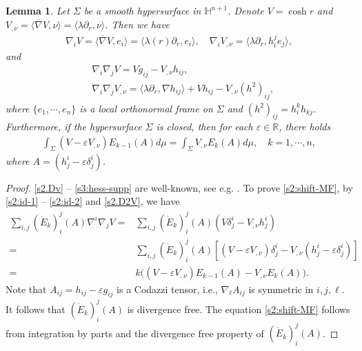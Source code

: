 \documentclass[11pt,reqno]{amsart}
\newtheorem{lem}[thm]{Lemma}
\theoremstyle{definition}
\theoremstyle{remark}
\numberwithin{equation}{section}
\renewcommand{\(}{\left(}
\renewcommand{\)}{\right)}
\renewcommand{\~}{\widetilde}
\renewcommand{\-}{\overline}
\renewcommand{\d}{\delta}
\newcommand{\e}{\varepsilon}
\renewcommand{\l}{\lambda}
\renewcommand{\l}{\lambda}
\begin{document}
\begin{lem}
	Let $\Sigma$ be a smooth hypersurface in $\mathbb H^{n+1}$. Denote $V=\cosh r$ and $V_{,\nu}=\langle \-\nabla V,\nu\rangle=\langle \l\partial_r,\nu\rangle$. Then we have
    \begin{align}\label{s2.Dv}
		\nabla_i V =\langle \-\nabla V,e_i\rangle=\langle \l(r)\partial_r,e_i\rangle, \quad \nabla_i V_{,\nu}=\langle \l\partial_r, h_{i}^je_j\rangle,
    \end{align}
    and
    \begin{align}
    & \nabla_i\nabla_j V=V g_{ij}-V_{,\nu} h_{ij},\label{s2.D2V}\\
   & \nabla_i\nabla_j V_{,\nu}=\langle \l\partial_r,\nabla h_{ij}\rangle+V h_{ij} - V_{,\nu}(h^2)_{ij},\label{s3:hess-supp}
    \end{align}
    where $\{e_1,\cdots,e_n\}$ is a local orthonormal frame on $\Sigma$ and $(h^2)_{ij}=h_i^k h_{kj}$.
	Furthermore, if the hypersurface $\Sigma$ is closed, then for each $\e\in \mathbb R$, there holds
	\begin{align}\label{s2:shift-MF}
	\int_{\Sigma} (V-\e V_{,\nu}) E_{k-1}(A) d\mu = \int_{\Sigma} V_{,\nu} E_{k}(A) d\mu, \quad k=1,\cdots,n,
	\end{align}
	where $A=(h_j^i-\e \d_j^i)$.
\end{lem}
\begin{proof}
    \eqref{s2.Dv} -- \eqref{s3:hess-supp} are well-known, see e.g. \cite{Guan-Li2014}. To prove \eqref{s2:shift-MF}, by \eqref{s2:id-1} -- \eqref{s2:id-2} and \eqref{s2.D2V}, we have
	\begin{align}\label{s2.div}
	 \sum_{i,j}(\dot{E}_k)_i^j(A) \nabla^i\nabla_j V=&\sum_{i,j}(\dot{E}_k)_i^j(A) (V\d_j^i- V_{,\nu} h_j^i)\nonumber\\
=&\sum_{i,j}(\dot{E}_k)_i^j(A) \left[ (V-\e V_{,\nu})\d_j^i-V_{,\nu}(h_j^i-\e \d_j^i)\right]\nonumber\\
=&k\Big((V-\e V_{,\nu}) E_{k-1}(A)-V_{,\nu}E_{k}(A)\Big).
	\end{align}
 Note that $A_{ij}=h_{ij}-\e g_{ij}$ is a Codazzi tensor, i.e., $\nabla_\ell A_{ij}$ is symmetric in $i,j,\ell$. It follows that $(\dot{E}_k)_i^j(A)$ is divergence free. The equation \eqref{s2:shift-MF} follows from  integration by parts and the divergence free property of $(\dot{E}_k)_i^j(A)$.
\end{proof}
\end{document}
